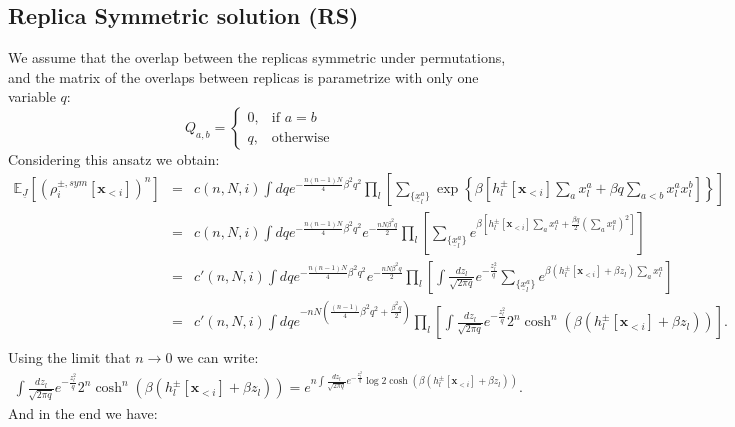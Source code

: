 \documentclass{article}
\begin{document}
\subsection{Replica Symmetric solution (RS)}
We assume that the overlap between the replicas symmetric under permutations, and the matrix of the overlaps between replicas is parametrize with only one variable $q$:
$$
Q_{a,b}=\begin{cases}
			0, & \text{if $a=b$}\\
            q, & \text{otherwise}
		 \end{cases}
$$
Considering this ansatz we obtain:
\begin{eqnarray}
\mathbb{E}_{\underline{J}}\left[(\rho_i^{\pm, sym}[\mathbf{x}_{<i}])^n \right] & = & 
c(n,N,i)
\int dq e^{-\frac{n(n-1)N}{4}\beta^2 q^2}
\prod_{l} \left[
\sum_{\{\underline{x}^{a}_l\}} 
\exp\left\{\beta \left[
h_l^{\pm}[\mathbf{x}_{<i}] \sum_{a} x_l^{a} +\beta q \sum_{a<b} x_l^{a} x_l^{b} \right]  \right\} 
\right] \\
& = &
c(n,N,i)
\int dq e^{-\frac{n(n-1)N}{4}\beta^2 q^2}
e^{-\frac{nN\beta^2 q}{2}}
\prod_{l} \left[
\sum_{\{\underline{x}^{a}_l\}} 
e^{\beta \left[
h_l^{\pm}[\mathbf{x}_{<i}] \sum_{a} x_l^{a} + \frac{\beta q}{2} \left(\sum_{a} x_l^{a} \right)^2 \right]} 
\right]\\
& = &
c'(n,N,i)
\int dq e^{-\frac{n(n-1)N}{4}\beta^2 q^2}
e^{-\frac{nN\beta^2 q}{2}}
\prod_{l} \left[\int \frac{dz_l}{\sqrt{2\pi q}} e^{-\frac{z_l^2}{q}}
\sum_{\{\underline{x}^{a}_l\}} 
e^{\beta \left(
h_l^{\pm}[\mathbf{x}_{<i}] +\beta z_l \right) \sum_{a} x_l^{a}} 
\right]\\
& = &
c'(n,N,i)
\int dq e^{-nN\left(\frac{(n-1)}{4}\beta^2 q^2 +\frac{\beta^2 q}{2}\right)}
\prod_{l} \left[\int \frac{dz_l}{\sqrt{2\pi q}} e^{-\frac{z_l^2}{q}}
2^n\cosh^n \left(\beta \left(
h_l^{\pm}[\mathbf{x}_{<i}] +\beta z_l \right)\right) 
\right].\\
\end{eqnarray}
Using the limit that $n\rightarrow 0$ we can write:
\begin{eqnarray}
\int \frac{dz_l}{\sqrt{2\pi q}} e^{-\frac{z_l^2}{q}}
2^n\cosh^n \left(\beta \left(
h_l^{\pm}[\mathbf{x}_{<i}] +\beta z_l \right)\right) = e^{n \int \frac{dz_l}{\sqrt{2\pi q}} e^{-\frac{z_l^2}{q}}
\log 2\cosh \left(\beta \left(
h_l^{\pm}[\mathbf{x}_{<i}] +\beta z_l \right)\right)}.
\label{eq:gauss_n0}
\end{eqnarray}
And in the end we have:
\end{document}
